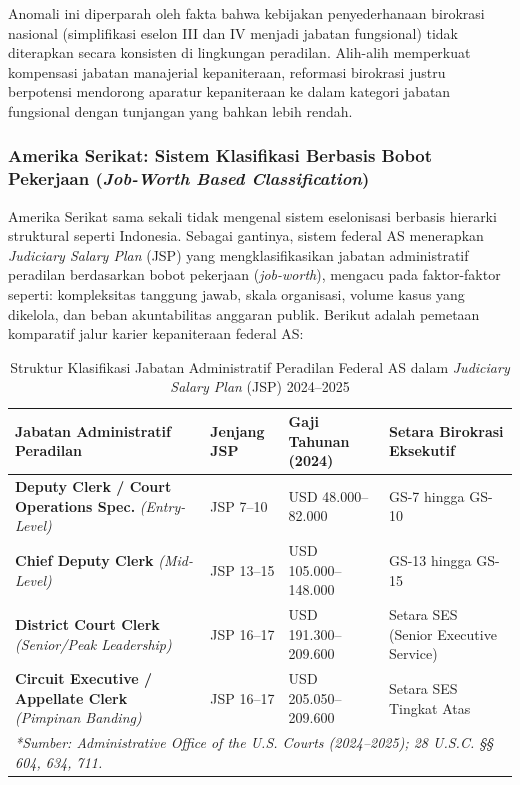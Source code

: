 \documentclass[12pt, a4paper]{article}
\begin{document}
Anomali ini diperparah oleh fakta bahwa kebijakan penyederhanaan birokrasi nasional (simplifikasi eselon III dan IV menjadi jabatan fungsional) tidak diterapkan secara konsisten di lingkungan peradilan. Alih-alih memperkuat kompensasi jabatan manajerial kepaniteraan, reformasi birokrasi justru berpotensi mendorong aparatur kepaniteraan ke dalam kategori jabatan fungsional dengan tunjangan yang bahkan lebih rendah.

\subsubsection{Amerika Serikat: Sistem Klasifikasi Berbasis Bobot Pekerjaan (\textit{Job-Worth Based Classification})}

Amerika Serikat sama sekali tidak mengenal sistem eselonisasi berbasis hierarki struktural seperti Indonesia. Sebagai gantinya, sistem federal AS menerapkan \textit{Judiciary Salary Plan} (JSP) yang mengklasifikasikan jabatan administratif peradilan berdasarkan bobot pekerjaan (\textit{job-worth}), mengacu pada faktor-faktor seperti: kompleksitas tanggung jawab, skala organisasi, volume kasus yang dikelola, dan beban akuntabilitas anggaran publik. Berikut adalah pemetaan komparatif jalur karier kepaniteraan federal AS:

\begin{table}[H]
\centering
\fontsize{9}{11}\selectfont
\caption{Struktur Klasifikasi Jabatan Administratif Peradilan Federal AS dalam \textit{Judiciary Salary Plan} (JSP) 2024--2025}
\label{tab:jsp-usa}
\renewcommand{\arraystretch}{1.35}
\begin{tabular}{p{4.8cm} p{3.4cm} p{2.5cm} p{3.4cm}}
\hline
\textbf{Jabatan Administratif Peradilan} & \textbf{Jenjang JSP} & \textbf{Gaji Tahunan (2024)} & \textbf{Setara Birokrasi Eksekutif} \tabularnewline
\hline
\raggedright\textbf{Deputy Clerk / Court Operations Spec.} \newline \textit{(Entry-Level)} & JSP 7--10 & USD 48.000--82.000 & GS-7 hingga GS-10 \tabularnewline
\raggedright\textbf{Chief Deputy Clerk} \newline \textit{(Mid-Level)} & JSP 13--15 & USD 105.000--148.000 & GS-13 hingga GS-15 \tabularnewline
\raggedright\textbf{District Court Clerk} \newline \textit{(Senior/Peak Leadership)} & JSP 16--17 & USD 191.300--209.600 & Setara SES (Senior Executive Service) \tabularnewline
\raggedright\textbf{Circuit Executive / Appellate Clerk} \newline \textit{(Pimpinan Banding)} & JSP 16--17 & USD 205.050--209.600 & Setara SES Tingkat Atas \tabularnewline
\hline
\multicolumn{4}{p{14.1cm}}{\textit{*Sumber: Administrative Office of the U.S. Courts (2024--2025); 28 U.S.C. §§ 604, 634, 711.}} \tabularnewline
\hline
\end{tabular}
\end{table}
\end{document}
